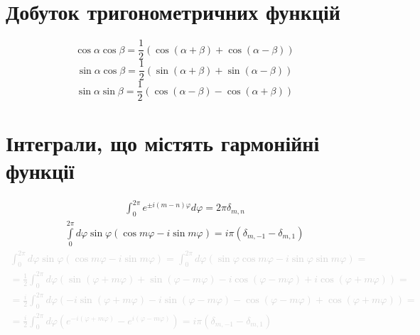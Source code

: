 \section{Добуток тригонометричних функцій}
%
\begin{equation}
\cos \alpha \cos \beta = \frac{1}{2} 
\left(  \cos (\alpha + \beta) + \cos (\alpha - \beta) \right)
\end{equation}
%
\begin{equation}
\sin \alpha \cos \beta = \frac{1}{2} 
\left( \sin (\alpha + \beta) + \sin (\alpha - \beta) \right)
\end{equation}
%
\begin{equation}
\sin \alpha \sin \beta = \frac{1}{2} 
\left( \cos (\alpha - \beta) - \cos (\alpha + \beta) \right)
\end{equation}
%
\section{Інтеграли, що містять гармонійні функції}
%
\begin{equation} \begin{aligned}
\int_{0}^{2\pi} e^{\pm i (m-n) \varphi} d \varphi = 2 \pi \delta_{m,n} 
\end{aligned} \end{equation}
%
\begin{equation} \begin{aligned}
\int \limits_{0}^{2\pi} d \varphi \sin \varphi 
\left( \cos m \varphi - i \sin m \varphi \right) = 
i \pi \left( \delta_{m,-1} - \delta_{m,1} \right)
\end{aligned} \end{equation}
%
\textcolor{lightgray}{ \begin{equation*} \begin{aligned}
\int_{0}^{2\pi} d \varphi \sin \varphi 
\left( \cos m \varphi - i \sin m \varphi \right) = \int_{0}^{2\pi} d \varphi
\left( \sin \varphi \cos m \varphi - i \sin \varphi \sin m \varphi \right) = \\
= \frac{1}{2} \int_{0}^{2\pi} d \varphi \left( \sin (\varphi + m \varphi) + 
\sin (\varphi - m \varphi) - i \cos (\varphi - m \varphi) + 
i \cos (\varphi + m \varphi) \right) = \\
= \frac{i}{2} \int_{0}^{2\pi} d \varphi \left( -i \sin (\varphi + m \varphi) -
i \sin (\varphi - m \varphi) - \cos (\varphi - m \varphi) + 
\cos (\varphi + m \varphi) \right) = \\
= \frac{i}{2} \int_{0}^{2\pi} d \varphi \left( e^{-i (\varphi + m \varphi)} - 
e^{i (\varphi - m \varphi)} \right) = 
i \pi \left( \delta_{m,-1} - \delta_{m,1} \right)
\end{aligned} \end{equation*} }
